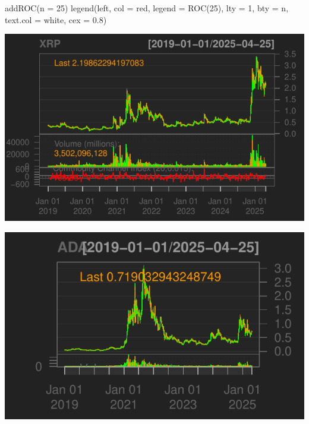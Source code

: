 \documentclass[]{tufte-handout}
\newenvironment{Shaded}{}{}
\newcommand{\AttributeTok}[1]{\textcolor[rgb]{0.49,0.56,0.16}{#1}}
\newcommand{\DecValTok}[1]{\textcolor[rgb]{0.25,0.63,0.44}{#1}}
\newcommand{\FloatTok}[1]{\textcolor[rgb]{0.25,0.63,0.44}{#1}}
\newcommand{\FunctionTok}[1]{\textcolor[rgb]{0.02,0.16,0.49}{#1}}
\newcommand{\NormalTok}[1]{#1}
\newcommand{\OtherTok}[1]{\textcolor[rgb]{0.00,0.44,0.13}{#1}}
\newcommand{\SpecialCharTok}[1]{\textcolor[rgb]{0.25,0.44,0.63}{#1}}
\newcommand{\StringTok}[1]{\textcolor[rgb]{0.25,0.44,0.63}{#1}}
\begin{document}
\begin{Shaded}
\begin{Highlighting}[]
\FunctionTok{addROC}\NormalTok{(}\AttributeTok{n =} \DecValTok{25}\NormalTok{)}
\FunctionTok{legend}\NormalTok{(}\StringTok{\textquotesingle{}left\textquotesingle{}}\NormalTok{, }\AttributeTok{col =} \StringTok{\textquotesingle{}red\textquotesingle{}}\NormalTok{, }\AttributeTok{legend =} \StringTok{\textquotesingle{}ROC(25)\textquotesingle{}}\NormalTok{, }\AttributeTok{lty =} \DecValTok{1}\NormalTok{, }\AttributeTok{bty =} \StringTok{\textquotesingle{}n\textquotesingle{}}\NormalTok{,}
       \AttributeTok{text.col =} \StringTok{\textquotesingle{}white\textquotesingle{}}\NormalTok{, }\AttributeTok{cex =} \FloatTok{0.8}\NormalTok{)}
\end{Highlighting}
\end{Shaded}

\includegraphics{cripto_update_files/figure-latex/unnamed-chunk-11-8}

\begin{Shaded}
\end{Shaded}

\includegraphics{cripto_update_files/figure-latex/unnamed-chunk-11-9}
\end{document}
